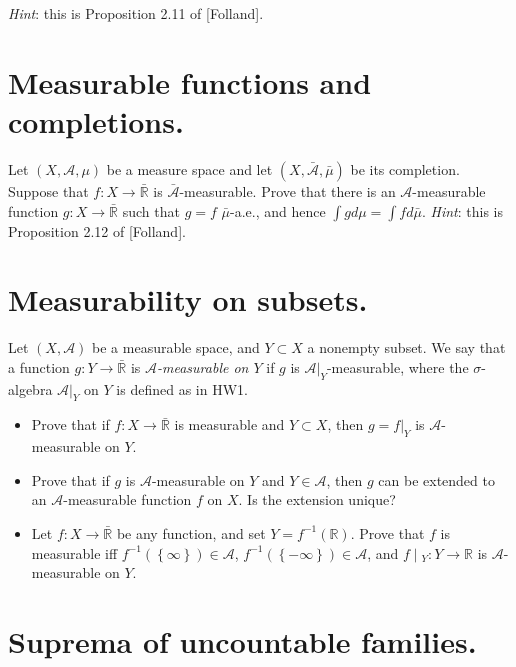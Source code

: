 \documentclass{qlnotes-export}
\begin{document}
\emph{Hint}: this is Proposition 2.11 of {[}Folland{]}.

\section{Measurable functions and completions.}

Let \((X,\mathcal{A},\mu)\) be a measure space and let \((X,\bar{\mathcal{A}},\bar{\mu})\) be its completion. Suppose that \(f:X\rightarrow\bar{\mathbb{R}}\) is \(\bar{\mathcal{A}}\)-measurable. Prove that there is an \(\mathcal{A}\)-measurable function \(g:X\rightarrow\bar{\mathbb{R}}\) such that \(g = f\) \(\bar{\mu}\)-a.e., and hence \(\int g d\mu = \int f d\bar{\mu}\). \emph{Hint}: this is Proposition 2.12 of {[}Folland{]}.

\section{Measurability on subsets.}

Let \((X,\mathcal{A})\) be a measurable space, and \(Y \subset X\) a nonempty subset. We say that a function \(g:Y\rightarrow\bar{\mathbb{R}}\) is \emph{\(\mathcal{A}\)-measurable on \(Y\)} if \(g\) is \(\mathcal{A}|_{Y}\)-measurable, where the \(\sigma\)-algebra \(\mathcal{A}|_{Y}\) on \(Y\) is defined as in HW1.

\begin{itemize}
\item
  Prove that if \(f:X\rightarrow\bar{\mathbb{R}}\) is measurable and \(Y \subset X\), then \(g = f|_{Y}\) is \(\mathcal{A}\)-measurable on \(Y\).
\item
  Prove that if \(g\) is \(\mathcal{A}\)-measurable on \(Y\) and \(Y \in \mathcal{A}\), then \(g\) can be extended to an \(\mathcal{A}\)-measurable function \(f\) on \(X\). Is the extension unique?
\item
  Let \(f:X\rightarrow\bar{\mathbb{R}}\) be any function, and set \(Y = f^{- 1}({\mathbb{R}})\). Prove that \(f\) is measurable iff \(f^{- 1}(\left\{ \infty \right\}) \in \mathcal{A}\), \(f^{- 1}(\left\{ {- \infty} \right\}) \in \mathcal{A}\), and \(\left. f \middle| {}_{Y}:Y\rightarrow{\mathbb{R}} \right.\) is \(\mathcal{A}\)-measurable on \(Y\).
\end{itemize}

\section{Suprema of uncountable families.}
\end{document}
